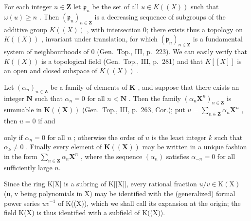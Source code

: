 For each integer \(n \in \mathbf{Z}\) let \(\mathfrak{p}_n\) be the set of all \(u \in K((X))\) such that \(\omega(u) \geqslant n\) . Then \((\mathfrak{p}_n)_{n \in \mathbf{Z}}\) is a decreasing sequence of subgroups of the additive group \(K((X))\) , with intersection 0; there exists thus a topology on \(K((X))\) , invariant under translation, for which \((\mathfrak{p}_n)_{n \in \mathbf{Z}}\) is a fundamental system of neighbourhoods of 0 (Gen.~Top., III, p.~223). We can easily verify that \(K((X))\) is a topological field (Gen.~Top., III, p.~281) and that \(K[[X]]\) is an open and closed subspace of \(K((X))\) .

Let \((\alpha_{n})_{n\in \mathbf{Z}}\) be a family of elements of \(\mathbf{K}\) , and suppose that there exists an integer \(\mathbf{N}\) such that \(\alpha_{n} = 0\) for all \(n < \mathbf{N}\) . Then the family \((\alpha_{n}\mathbf{X}^{n})_{n\in \mathbf{Z}}\) is summable in \(\mathbf{K}((\mathbf{X}))\) (Gen.~Top., III, p.~263, Cor.); put \(u = \sum_{n\in \mathbf{Z}}\alpha_n\mathbf{X}^n\) , then \(u = 0\) if and

only if \(\alpha_{n} = 0\) for all \(n\) ; otherwise the order of \(u\) is the least integer \(k\) such that \(\alpha_{k} \neq 0\) . Finally every element of \(\mathbf{K}((\mathbf{X}))\) may be written in a unique fashion in the form \(\sum_{n \in \mathbf{Z}} \alpha_{n} \mathbf{X}^{n}\) , where the sequence \((\alpha_{n})\) satisfies \(\alpha_{-n} = 0\) for all sufficiently large \(n\).

Since the ring K{[}X{]} is a subring of K{[}{[}X{]}{]}, every rational fraction \(u/v \in \mathrm{K}(\mathrm{X})\) (u, v being polynomials in X) may be identified with the (generalized) formal power series \(uv^{-1}\) of K((X)), which we shall call its expansion at the origin; the field K(X) is thus identified with a subfield of K((X)).

